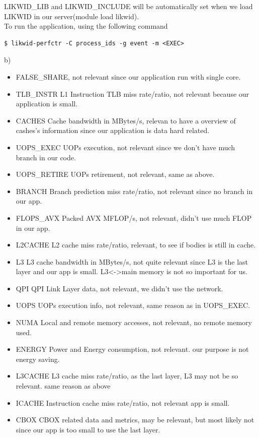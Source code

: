\documentclass[article]{scrartcl}
\begin{document}
LIKWID\_LIB and LIKWID\_INCLUDE will be automatically set when we load LIKWID in our server(module load likwid).\\
To run the application, using the following command
\begin{lstlisting}[frame=single]
    $ likwid-perfctr -C process_ids -g event -m <EXEC> 
\end{lstlisting}
b)
\begin{itemize}
    \item FALSE\_SHARE, not relevant since our application run with single core.
    \item TLB\_INSTR  L1 Instruction TLB miss rate/ratio, not relevant because our application is small.
    \item CACHES  Cache bandwidth in MBytes/s, relevan to have a overview of cashes's information since our application is data hard related.
    \item UOPS\_EXEC  UOPs execution, not relevant since we don't have much branch in our code.
    \item UOPS\_RETIRE  UOPs retirement, not relevant, same as above.
    \item BRANCH  Branch prediction miss rate/ratio, not relevant since no branch in our app.
    \item FLOPS\_AVX  Packed AVX MFLOP/s, not relevant, didn't use much FLOP in our app.
    \item L2CACHE  L2 cache miss rate/ratio, relevant, to see if bodies is still in cache.
    \item L3  L3 cache bandwidth in MBytes/s, not quite relevant since L3 is the last layer and our app is small. L3<->main memory is not so important for us.
    \item QPI  QPI Link Layer data, not relevant, we didn't use the network.
    \item UOPS  UOPs execution info, not relevant, same reason as in UOPS\_EXEC.
    \item NUMA  Local and remote memory accesses, not relevant, no remote memory used.
    \item ENERGY  Power and Energy consumption, not relevant. our purpose is not energy saving.
    \item L3CACHE  L3 cache miss rate/ratio, as the last layer, L3 may not be so relevant. same reason as above
    \item ICACHE  Instruction cache miss rate/ratio, not relevant app is small.
    \item CBOX  CBOX related data and metrics, may be relevant, but most likely not since our app is too small to use the last layer.

\end{itemize}
\end{document}
